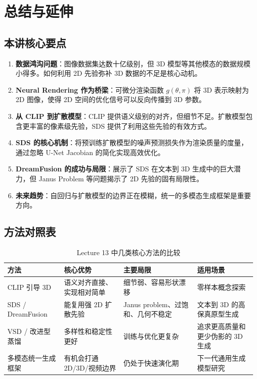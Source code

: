 \section{总结与延伸}

\subsection{本讲核心要点}

\begin{enumerate}
    \item \textbf{数据鸿沟问题}：图像数据集达数十亿级别，但 3D 模型等其他模态的数据规模小得多。如何利用 2D 先验弥补 3D 数据的不足是核心动机。

    \item \textbf{Neural Rendering 作为桥梁}：可微分渲染函数 $g(\theta, \pi)$ 将 3D 表示映射为 2D 图像，使得 2D 空间的优化信号可以反向传播到 3D 参数。

    \item \textbf{从 CLIP 到扩散模型}：CLIP 提供语义级别的对齐，但细节不足。扩散模型包含更丰富的像素级先验，SDS 提供了利用这些先验的有效方式。

    \item \textbf{SDS 的核心机制}：将预训练扩散模型的噪声预测损失作为渲染质量的度量，通过忽略 U-Net Jacobian 的简化实现高效优化。

    \item \textbf{DreamFusion 的成功与局限}：展示了 SDS 在文本到 3D 生成中的巨大潜力，但 Janus Problem 等问题揭示了 2D 先验的固有局限性。

    \item \textbf{未来趋势}：自回归与扩散模型的边界正在模糊，统一的多模态生成框架是重要方向。
\end{enumerate}

\subsection{方法对照表}

\begin{table}[H]
\centering
\begin{tabular}{p{} p{} p{} p{}}
\toprule
方法 & 核心优势 & 主要局限 & 适用场景 \\
\midrule
CLIP 引导 3D & 语义对齐直接、实现相对简单 & 细节弱、容易形状漂移 & 零样本概念探索 \\
SDS / DreamFusion & 能复用强 2D 扩散先验 & Janus problem、过饱和、几何不稳定 & 文本到 3D 的高保真原型生成 \\
VSD / 改进型蒸馏 & 多样性和稳定性更好 & 训练与优化更复杂 & 追求更高质量和更少伪影的 3D 生成 \\
多模态统一生成框架 & 有机会打通 2D/3D/视频边界 & 仍处于快速演化期 & 下一代通用生成模型研究 \\
\bottomrule
\end{tabular}
\caption{Lecture 13 中几类核心方法的比较}
\end{table}

